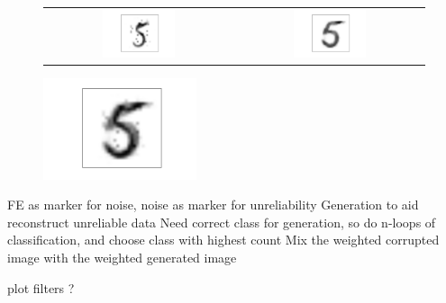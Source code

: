 \documentclass{report}
\begin{document}
\begin{figure}
\begin{center}
\begin{tabular}{c  c}
\includegraphics[width=0.4\textwidth]{nw} & \includegraphics[width=0.4\textwidth]{gw} \\
\end{tabular}
\includegraphics[width=0.4\textwidth]{mix}
\end{center}
\end{figure}


FE as marker for noise, noise as marker for unreliability
Generation to aid reconstruct unreliable data
Need correct class for generation, so do n-loops of classification, and choose class with highest count
Mix the weighted corrupted image with the weighted generated image


plot filters ?
\end{document}
